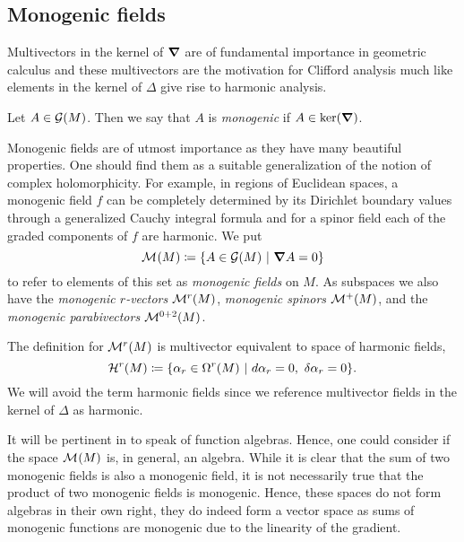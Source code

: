 \subsection{Monogenic fields}

Multivectors in the kernel of $\boldsymbol{\nabla}$ are of fundamental importance in geometric calculus and these multivectors are the motivation for Clifford analysis much like elements in the kernel of $\Delta$ give rise to harmonic analysis. 
\begin{definition}
 Let $A \in \mathcal{G}(M)$. Then we say that $A$ is \emph{monogenic} if $A \in \ker(\boldsymbol{\nabla})$.
\end{definition}

Monogenic fields are of utmost importance as they have many beautiful properties. One should find them as a suitable generalization of the notion of complex holomorphicity. For example, in regions of Euclidean spaces, a monogenic field $f$ can be completely determined by its Dirichlet boundary values through a generalized Cauchy integral formula and for a spinor field each of the graded components of $f$ are harmonic. We put 
\[
\mathcal{M}^{}(M)\coloneqq \{A \in \mathcal{G}(M) ~\vert~ \boldsymbol{\nabla} A =0\}
\]
to refer to elements of this set as \emph{monogenic fields} on $M$. As subspaces we also have the \emph{monogenic $r$-vectors} $\mathcal{M}^{r}(M)$, \emph{monogenic spinors} $\mathcal{M}^{+}(M)$, and the \emph{monogenic parabivectors} $\mathcal{M}^{0+2}(M)$. 

\begin{remark}
The definition for $\mathcal{M}^{r}(M)$ is multivector equivalent to space of harmonic fields,
    \begin{equation}
        \mathcal{H}^{r}(M)\coloneqq \{\alpha_r \in \Omega^{r}(M) ~\vert~ d \alpha_r = 0, ~ \delta \alpha_r = 0\}.
    \end{equation}
We will avoid the term harmonic fields since we reference multivector fields in the kernel of $\Delta$ as harmonic.
\end{remark}

It will be pertinent in  to speak of function algebras. Hence, one could consider if the space $\mathcal{M}^{}(M)$ is, in general, an algebra. While it is clear that the sum of two monogenic fields is also a monogenic field, it is not necessarily true that the product of two monogenic fields is monogenic. Hence, these spaces do not form algebras in their own right, they do indeed form a vector space as sums of monogenic functions are monogenic due to the linearity of the gradient. 

